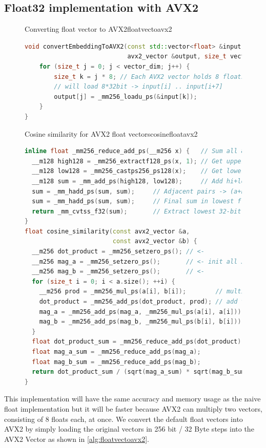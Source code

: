 \subsection{Float32 implementation with AVX2}
\label{floatimplavx2}
\begin{figure}[h]
    \begin{algorithm}{Converting float vector to AVX2}{floatvectoavx2}
        \begin{lstlisting}[language=C++]
void convertEmbeddingToAVX2(const std::vector<float> &input,
                            avx2_vector &output, size_t vector_dim) {
    for (size_t j = 0; j < vector_dim; j++) {
        size_t k = j * 8; // Each AVX2 vector holds 8 floats
        // will load 8*32bit -> input[i] .. input[i+7]
        output[j] = _mm256_loadu_ps(&input[k]);
    }
}
    \end{lstlisting}
    \end{algorithm}
\end{figure}
\begin{figure}[H]
    \begin{algorithm}{Cosine similarity for AVX2 float vectors}{cosinefloatavx2}
        \begin{lstlisting}[language=C++]
inline float _mm256_reduce_add_ps(__m256 x) {   // Sum all 8 floats in x
  __m128 high128 = _mm256_extractf128_ps(x, 1); // Get upper 4 floats
  __m128 low128 = _mm256_castps256_ps128(x);    // Get lower 4 floats
  __m128 sum = _mm_add_ps(high128, low128);     // Add hi+lo -> 4 floats
  sum = _mm_hadd_ps(sum, sum);     // Adjacent pairs -> (a+b,c+d,a+b,c+d)
  sum = _mm_hadd_ps(sum, sum);     // Final sum in lowest float
  return _mm_cvtss_f32(sum);       // Extract lowest 32-bit float
}
float cosine_similarity(const avx2_vector &a,
                        const avx2_vector &b) {
  __m256 dot_product = _mm256_setzero_ps(); // <-
  __m256 mag_a = _mm256_setzero_ps();       // <- init all 3 vars with 0
  __m256 mag_b = _mm256_setzero_ps();       // <-
  for (size_t i = 0; i < a.size(); ++i) {
    __m256 prod = _mm256_mul_ps(a[i], b[i]);        // multiply vectors
    dot_product = _mm256_add_ps(dot_product, prod); // add to running sum
    mag_a = _mm256_add_ps(mag_a, _mm256_mul_ps(a[i], a[i]));//mag_a+=a^2
    mag_b = _mm256_add_ps(mag_b, _mm256_mul_ps(b[i], b[i]));//mag_b+=b^2
  }
  float dot_product_sum = _mm256_reduce_add_ps(dot_product);
  float mag_a_sum = _mm256_reduce_add_ps(mag_a);
  float mag_b_sum = _mm256_reduce_add_ps(mag_b);
  return dot_product_sum / (sqrt(mag_a_sum) * sqrt(mag_b_sum));
}
    \end{lstlisting}
    \end{algorithm}
\end{figure}
This implementation will have the same accuracy and memory usage as the naive float implementation but it will be faster because AVX2 can multiply two vectors, consisting of 8 floats each, at once. We convert the default float vectors into AVX2 by simply loading the original vectors in 256 bit / 32 Byte steps into the AVX2 Vector as shown in \autoref{alg:floatvectoavx2}.

